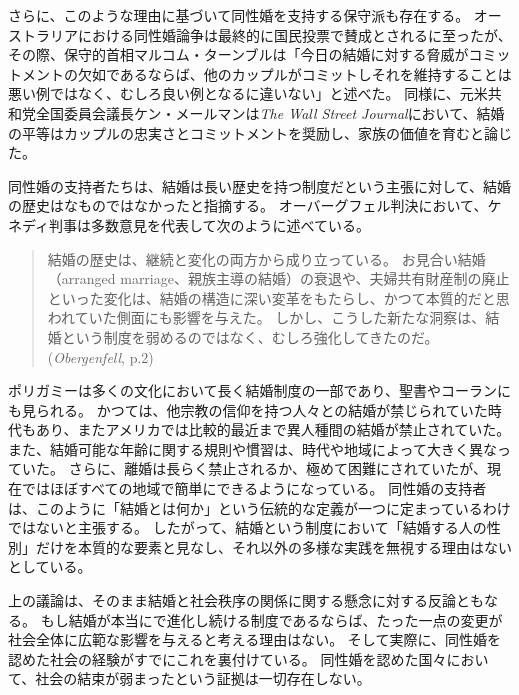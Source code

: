 \documentclass[paper=a4,book,openany]{jlreq}
\begin{document}
さらに、このような理由に基づいて同性婚を支持する保守派も存在する。
オーストラリアにおける同性婚論争は最終的に国民投票で賛成とされるに至ったが、その際、保守的首相マルコム・ターンブルは「今日の結婚に対する脅威がコミットメントの欠如であるならば、他のカップルがコミットしそれを維持することは悪い例ではなく、むしろ良い例となるに違いない」と述べた\citep{gartrell17:_malcol_turnb_makes_conser_case}。
同様に、元米共和党全国委員会議長ケン・メールマンは\emph{The Wall Street Journal}において、結婚の平等はカップルの忠実さとコミットメントを奨励し、家族の価値を育むと論じた\citep{mehlman12:_makin_same_sex_case}。

同性婚の支持者たちは、結婚は長い歴史を持つ制度だという主張に対して、結婚の歴史はなものではなかったと指摘する。
オーバーグフェル判決において、ケネディ判事は多数意見を代表して次のように述べている。

\begin{quote}
結婚の歴史は、継続と変化の両方から成り立っている。
お見合い結婚（arranged marriage、親族主導の結婚）の衰退や、夫婦共有財産制の廃止といった変化は、結婚の構造に深い変革をもたらし、かつて本質的だと思われていた側面にも影響を与えた。
しかし、こうした新たな洞察は、結婚という制度を弱めるのではなく、むしろ強化してきたのだ。
(\emph{Obergenfell}, p.2)
\end{quote}

ポリガミーは多くの文化において長く結婚制度の一部であり、聖書やコーランにも見られる。
かつては、他宗教の信仰を持つ人々との結婚が禁じられていた時代もあり、またアメリカでは比較的最近まで異人種間の結婚が禁止されていた。
また、結婚可能な年齢に関する規則や慣習は、時代や地域によって大きく異なっていた。
さらに、離婚は長らく禁止されるか、極めて困難にされていたが、現在ではほぼすべての地域で簡単にできるようになっている。
同性婚の支持者は、このように「結婚とは何か」という伝統的な定義が一つに定まっているわけではないと主張する。
したがって、結婚という制度において「結婚する人の性別」だけを本質的な要素と見なし、それ以外の多様な実践を無視する理由はないとしている。

上の議論は、そのまま結婚と社会秩序の関係に関する懸念に対する反論ともなる。
もし結婚が本当にで進化し続ける制度であるならば、たった一点の変更が社会全体に広範な影響を与えると考える理由はない。
そして実際に、同性婚を認めた社会の経験がすでにこれを裏付けている。
同性婚を認めた国々において、社会の結束が弱まったという証拠は一切存在しない。
\end{document}
